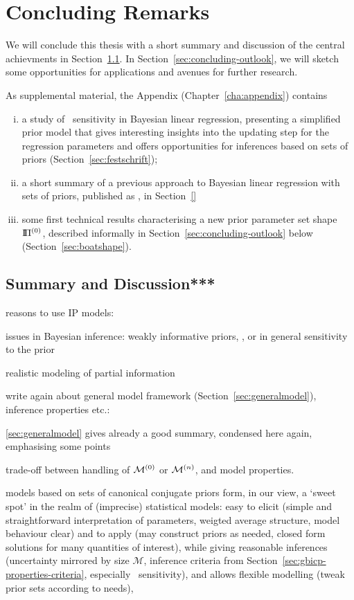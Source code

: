 \chapter{Concluding Remarks}
\label{cha:concluding}

We will conclude this thesis with a short summary and discussion of the central achievments in Section~\ref{sec:concluding-summary}.
In Section~\ref{sec:concluding-outlook}, we will sketch some opportunities for applications and avenues for further research.

As supplemental material, the Appendix (Chapter~\ref{cha:appendix}) contains
\begin{enumerate}[(i)]
\item a study of \pdc\ sensitivity in Bayesian linear regression,
presenting a simplified prior model that gives interesting insights into the updating step
for the regression parameters and offers opportunities for inferences based on sets of priors
(Section~\ref{sec:festschrift});
\item a short summary of a previous approach to Bayesian linear regression
with sets of priors, published as \parencite{Walter2007a}, in Section~\ref{}
\item some first technical results characterising a new prior parameter set shape $\text{I}\!\Pi^{(0)}$,
described informally in Section~\ref{sec:concluding-outlook} below
(Section~\ref{sec:boatshape}).
\end{enumerate}


\section{Summary and Discussion***}
\label{sec:concluding-summary}

reasons to use IP models:

issues in Bayesian inference: weakly informative priors, \pdc, or in general sensitivity to the prior

realistic modeling of partial information


write again about general model framework (Section~\ref{sec:generalmodel}),
inference properties etc.:

\ref{sec:generalmodel} gives already a good summary, condensed here again, emphasising some points

trade-off between handling of $\mathcal{M}^{(0)}$ or $\mathcal{M}^{(n)}$, and model properties.

models based on sets of canonical conjugate priors form, in our view,
a `sweet spot' in the realm of (imprecise) statistical models:
easy to elicit (simple and straightforward interpretation of parameters,
weigted average structure, model behaviour clear)
and to apply (may construct priors as needed, closed form solutions for many quantities of interest),
while giving reasonable inferences (uncertainty mirrored by size $\mathcal{M}$,
inference criteria from Section~\ref{sec:gbicp-properties-criteria}, especially \pdc\ sensitivity),
and allows flexible modelling (tweak prior sets according to needs),

